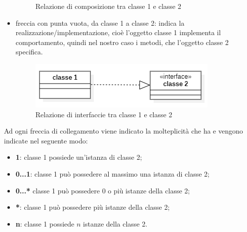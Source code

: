 \begin{itemize}
\begin{figure}[H]
		\caption{Relazione di composizione tra classe 1 e classe 2}
	\end{figure}
	\item freccia con punta vuota, da classe 1 a classe 2: indica la realizzazione/implementazione, cioè l'oggetto classe 1 implementa il comportamento, quindi nel nostro caso i metodi, che l'oggetto classe 2 specifica.
	\begin{figure}[H]
		\centering\includegraphics{../immagini/normeUML/frecInter.png}
		\caption{Relazione di interfaccie tra classe 1 e classe 2}
	\end{figure}
\end{itemize}
Ad ogni freccia di collegamento viene indicato la molteplicità che ha e vengono indicate nel seguente modo:
\begin{itemize}
	\item \textbf{1}: classe 1 possiede un'istanza di classe 2;
	\item \textbf{0...1}: classe 1 può possedere al massimo una istanza di classe 2;
	\item \textbf{0...*} classe 1 può possedere 0 o più istanze della classe 2;
	\item \textbf{*}: classe 1 può possedere più istanze della classe 2;
	\item \textbf{n}: classe 1 possiede $n$ istanze della classe 2.
\end{itemize}
